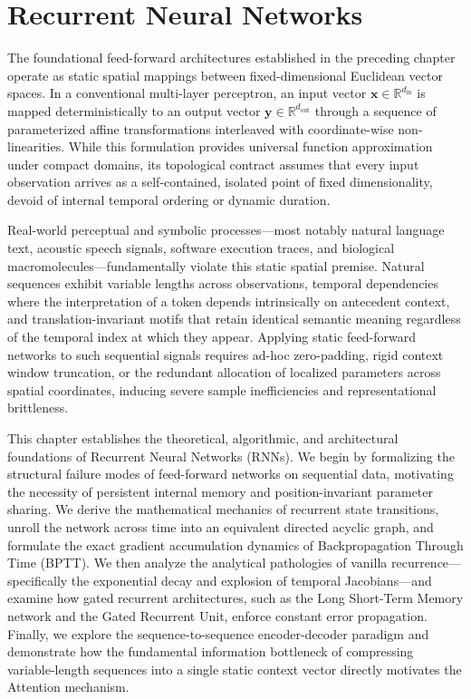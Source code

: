\documentclass[../../main.tex]{subfiles}
\begin{document}
\chapter{Recurrent Neural Networks}
\label{ch:recurrent_neural_networks}
\label{ch:rnn_sequence_modeling}

The foundational feed-forward architectures established in the preceding chapter operate as static spatial mappings between fixed-dimensional Euclidean vector spaces. In a conventional multi-layer perceptron, an input vector $\mathbf{x} \in \mathbb{R}^{d_{\text{in}}}$ is mapped deterministically to an output vector $\mathbf{y} \in \mathbb{R}^{d_{\text{out}}}$ through a sequence of parameterized affine transformations interleaved with coordinate-wise non-linearities. While this formulation provides universal function approximation under compact domains, its topological contract assumes that every input observation arrives as a self-contained, isolated point of fixed dimensionality, devoid of internal temporal ordering or dynamic duration.

Real-world perceptual and symbolic processes—most notably natural language text, acoustic speech signals, software execution traces, and biological macromolecules—fundamentally violate this static spatial premise. Natural sequences exhibit variable lengths across observations, temporal dependencies where the interpretation of a token depends intrinsically on antecedent context, and translation-invariant motifs that retain identical semantic meaning regardless of the temporal index at which they appear. Applying static feed-forward networks to such sequential signals requires ad-hoc zero-padding, rigid context window truncation, or the redundant allocation of localized parameters across spatial coordinates, inducing severe sample inefficiencies and representational brittleness.

This chapter establishes the theoretical, algorithmic, and architectural foundations of Recurrent Neural Networks (RNNs). We begin by formalizing the structural failure modes of feed-forward networks on sequential data, motivating the necessity of persistent internal memory and position-invariant parameter sharing. We derive the mathematical mechanics of recurrent state transitions, unroll the network across time into an equivalent directed acyclic graph, and formulate the exact gradient accumulation dynamics of Backpropagation Through Time (BPTT). We then analyze the analytical pathologies of vanilla recurrence—specifically the exponential decay and explosion of temporal Jacobians—and examine how gated recurrent architectures, such as the Long Short-Term Memory network and the Gated Recurrent Unit, enforce constant error propagation. Finally, we explore the sequence-to-sequence encoder-decoder paradigm and demonstrate how the fundamental information bottleneck of compressing variable-length sequences into a single static context vector directly motivates the Attention mechanism.
\end{document}
